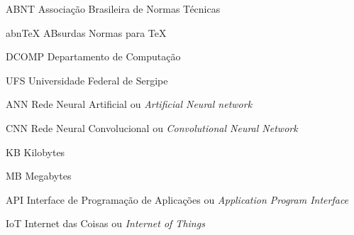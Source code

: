 
\begin{siglas}
	\item[ABNT]{Associação Brasileira de Normas Técnicas}
	\item[abnTeX]{ABsurdas Normas para TeX}
  	\item[DCOMP]{Departamento de Computação}
	\item[UFS]{Universidade Federal de Sergipe}
	\item[ANN]{Rede Neural Artificial ou \textit{Artificial Neural network}}
	\item[CNN]{Rede Neural Convolucional ou \textit{Convolutional Neural Network}}
	\item[KB]{Kilobytes}
	\item[MB]{Megabytes}
	\item[API]{Interface de Programação de Aplicações ou \textit{Application Program Interface}}
	\item[IoT]{Internet das Coisas ou \textit{Internet of Things}}
\end{siglas}
